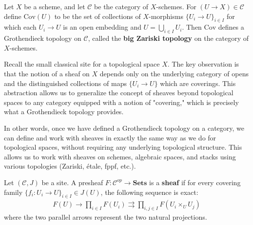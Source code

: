 \documentclass[12pt]{article}
\begin{document}
\begin{example}
    Let $X$ be a scheme, and let $\mathcal{C}$ be the category of $X$-schemes. For $(U \to X) \in \mathcal{C}$ define $\text{Cov}(U)$ to be the set of collections of $X$-morphisms $\{U_i \to U\}_{i \in I}$ for which each $U_i \to U$ is an open embedding and $U = \bigcup_{i \in I} U_i$. Then $\text{Cov}$ defines a Grothendieck topology on $\mathcal{C}$, called the \textbf{big Zariski topology} on the category of $X$-schemes.
\end{example}
\begin{remark}
    Recall the small classical site for a topological space $X$. The key observation is that the notion of a sheaf on $X$ depends only on the underlying category of opens and the distinguished collections of maps $\{U_i \to U\}$ which are coverings. This abstraction allows us to generalize the concept of sheaves beyond topological spaces to any category equipped with a notion of "covering," which is precisely what a Grothendieck topology provides.

    In other words, once we have defined a Grothendieck topology on a category, we can define and work with sheaves in exactly the same way as we do for topological spaces, without requiring any underlying topological structure. This allows us to work with sheaves on schemes, algebraic spaces, and stacks using various topologies (Zariski, étale, fppf, etc.).
\end{remark}
\begin{definition}
    Let $(\mathcal{C}, J)$ be a site. A presheaf $F: \mathcal{C}^{op} \to \mathbf{Sets}$ is a \textbf{sheaf} if for every covering family $\{f_i: U_i \to U\}_{i \in I} \in J(U)$, the following sequence is exact:
    \begin{align*}
        F(U) \to \prod_{i \in I} F(U_i) \rightrightarrows \prod_{i,j \in I} F(U_i \times_U U_j)
    \end{align*}
    where the two parallel arrows represent the two natural projections.
\end{definition}
\end{document}
